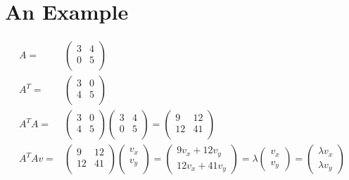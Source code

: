 \documentclass{article}
\begin{document}
\section{An Example }
\begin{align*}
    A=      & \begin{pmatrix}
        3 & 4 \\0&5\\
    \end{pmatrix}                                                                                                                \\
    A^T=    & \begin{pmatrix}
        3 & 0 \\4&5\\
    \end{pmatrix}                                                                                                                \\
    A^T A=  & \begin{pmatrix}
        3 & 0 \\4&5\\
    \end{pmatrix}\begin{pmatrix}
        3 & 4 \\0&5\\
    \end{pmatrix}=\begin{pmatrix}
        9 & 12 \\12&41\\
    \end{pmatrix}                                                             \\
    A^T Av= & \begin{pmatrix}
        9 & 12 \\12&41\\
    \end{pmatrix}\begin{pmatrix}
        v_x \\v_y\\
    \end{pmatrix}=\begin{pmatrix}
        9v_x + 12v_y \\12v_x +41v_y
    \end{pmatrix}=\lambda\begin{pmatrix}
        v_x \\v_y
    \end{pmatrix}=\begin{pmatrix}
        \lambda v_x \\\lambda v_y
    \end{pmatrix} \\
\end{align*}
\end{document}
